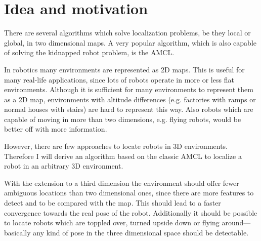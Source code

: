 \documentclass[Thesis.tex]{subfiles}
\begin{document}
\section{Idea and motivation}

There are several algorithms which solve localization problems, be they local or global, in two dimensional maps. A very popular algorithm, which is also capable of solving the kidnapped robot problem, is the \gls{AMCL}. 

In robotics many environments are represented as 2D maps. This is useful for many real-life applications, since lots of robots operate in more or less flat environments. Although it is sufficient for many environments to represent them as a 2D map, environments with altitude differences (e.g. factories with ramps or normal houses with stairs) are hard to represent this way. Also robots which are capable of moving in more than two dimensions, e.g. flying robots, would be better off with more information.

However, there are few approaches to locate robots in 3D environments. Therefore I will derive an algorithm based on the classic \gls{AMCL} to localize a robot in an arbitrary 3D environment.

With the extension to a third dimension the environment should offer fewer ambiguous locations than two dimensional ones, since there are more features to detect and to be compared with the map. This should lead to a faster convergence towards the real pose of the robot. Additionally it should be possible to locate robots which are toppled over, turned upside down or flying around---basically any kind of pose in the three dimensional space should be detectable.
\end{document}
